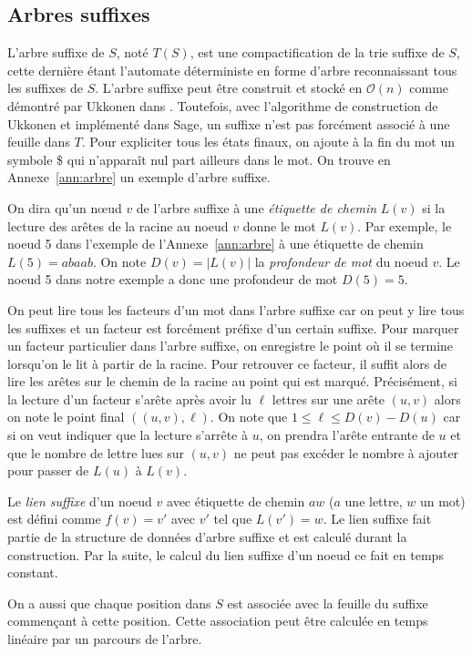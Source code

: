 \documentclass[10pt,letterpaper,oneside]{article}
\newcommand{\bigo}{\mathcal{O}}
\begin{document}
    \subsection{Arbres suffixes}
    L'arbre suffixe de $S$, noté $T(S)$,  est une compactification de la trie suffixe de $S$, cette dernière étant l'automate déterministe en forme d'arbre reconnaissant tous les suffixes de $S$. L'arbre suffixe peut être construit et stocké en $\bigo(n)$ comme démontré par Ukkonen dans \cite{MR1343552}. Toutefois, avec l'algorithme de construction de Ukkonen et implémenté dans Sage, un suffixe n'est pas forcément associé à une feuille dans $T$. Pour expliciter tous les états finaux, on ajoute à la fin du mot un symbole \$ qui n'apparaît nul part ailleurs dans le mot. On trouve en Annexe~\ref{ann:arbre} un exemple d'arbre suffixe.
    
    On dira qu'un nœud $v$ de l'arbre suffixe à une \emph{étiquette de chemin} $L(v)$ si la lecture des arêtes de la racine au noeud $v$ donne le mot $L(v)$. Par exemple, le noeud 5 dans l'exemple de l'Annexe~\ref{ann:arbre} à une étiquette de chemin $L(5)=abaab$. On note $D(v)=|L(v)|$ la \emph{profondeur de mot} du noeud $v$. Le noeud 5 dans notre exemple a donc une profondeur de mot $D(5)=5$.
    
    On peut lire tous les facteurs d'un mot dans l'arbre suffixe car on peut y lire tous les suffixes et un facteur est forcément préfixe d'un certain suffixe. Pour marquer un facteur particulier dans l'arbre suffixe, on enregistre le point où il se termine  lorsqu'on le lit à partir de la racine. Pour retrouver ce facteur, il suffit alors de lire les arêtes sur le chemin de la racine au point qui est marqué. Précisément, si la lecture d'un facteur s'arête après avoir lu $\ell$ lettres sur une arête $(u,v)$ alors on note le point final $((u,v),\ell)$. On note que $1\leq \ell \leq D(v)-D(u)$ car si on veut indiquer que la lecture s'arrête à $u$, on prendra l'arête entrante de $u$ et que le nombre de lettre lues sur $(u,v)$ ne peut pas excéder le nombre à ajouter pour passer de $L(u)$ à $L(v)$.
    
    Le \emph{lien suffixe} d'un noeud $v$ avec étiquette de chemin $aw$ ($a$ une lettre, $w$ un mot) est défini comme $f(v)=v'$ avec $v'$ tel que $L(v')=w$. Le lien suffixe fait partie de la structure de données d'arbre suffixe et est calculé durant la construction. Par la suite, le calcul du lien suffixe d'un noeud ce fait en temps constant.
    
    On a aussi que chaque position dans $S$ est associée avec la feuille du suffixe commençant à cette position. Cette association peut être calculée en temps linéaire par un parcours de l'arbre.
    
\end{document}
